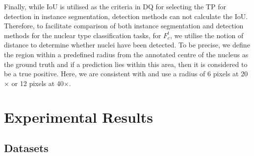 \documentclass[journal]{IEEEtran}
\begin{document}
    Finally, while IoU is utilised as the criteria in DQ for selecting the TP for detection in instance segmentation, detection methods can not calculate the IoU. Therefore, to facilitate comparison of both instance segmentation and detection methods for the nuclear type classification tasks, for $F_c^t$, we utilise the notion of distance to determine whether nuclei have been detected. To be precise, we define the region within a predefined radius from the annotated centre of the nucleus as the ground truth and if a prediction lies within this area, then it is considered to be a true positive. Here, we are consistent with \cite{sirinukunwattana2016locality} and use a radius of 6 pixels at 20$\times$ or 12 pixels at 40$\times$. 
    
	\section{Experimental Results} \label{section:expandresults}
	\subsection{Datasets} \label{section:datasets}
	


	\begin{table*}[!t]
    	\begin{center}
    		\caption{Summary of the datasets used in our experiments. UHCW denotes University Hospitals Conventry and Warwickshire and TCGA denotes The Cancer Genome Atlas. {\em Seg} denotes segmentation masks and {\em Class} denotes classification labels.}
    		\label{table:dataset_summary}
    		\setlength{\tabcolsep}{9pt} \renewcommand{\arraystretch}{1} 
    	\end{center}
	\end{table*}
\end{document}
